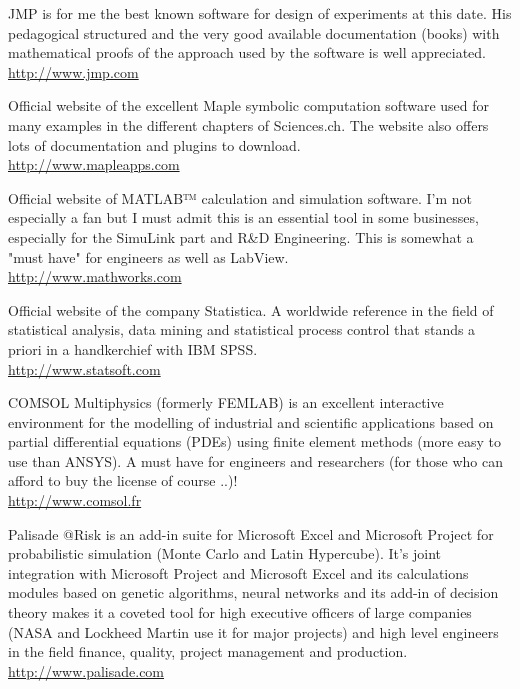 	{\Large {}}{\Large {}}{\Large {}} JMP is for me the best known software for design of experiments at this date. His pedagogical structured and the very good available documentation (books) with mathematical proofs of the approach used by the software is well appreciated.\\
	\href{http://www.jmp.com}{\color{blue}http://www.jmp.com}
	
	{\Large {}}{\Large {}}{\Large {}}{\Large {}} Official website of the excellent Maple symbolic computation software used for many examples in the different chapters of Sciences.ch. The website also offers lots of documentation and plugins to download.\\
	\href{http://www.mapleapps.com}{\color{blue}http://www.mapleapps.com}
	
	{\Large {}}{\Large {}}{\Large {}} Official website of MATLAB™ calculation and simulation software. I'm not especially a fan but I must admit this is an essential tool in some businesses, especially for the SimuLink part and R\&D Engineering. This is somewhat a "must have" for engineers as well as LabView.\\
	\href{http://www.mathworks.com}{\color{blue}http://www.mathworks.com}
	
	{\Large {}}{\Large {}}{\Large {}} Official website of the company Statistica. A worldwide reference in the field of statistical analysis, data mining and statistical process control that stands a priori in a handkerchief with IBM SPSS.\\
	\href{http://www.statsoft.com}{\color{blue}http://www.statsoft.com}
	
	{\Large {}}{\Large {}}{\Large {}}{\Large {}} COMSOL Multiphysics (formerly FEMLAB) is an excellent interactive environment for the modelling of industrial and scientific applications based on partial differential equations (PDEs) using finite element methods (more easy to use than ANSYS). A must have for engineers and researchers (for those who can afford to buy the license of course ..)!\\
	\href{http://www.comsol.fr}{\color{blue}http://www.comsol.fr}
	
	{\Large {}}{\Large {}}{\Large {}}{\Large {}} Palisade @Risk is an add-in suite for Microsoft Excel and Microsoft Project for probabilistic simulation (Monte Carlo and Latin Hypercube). It's joint integration with Microsoft Project and Microsoft Excel and its calculations modules based on genetic algorithms, neural networks and its add-in of decision theory makes it a coveted tool for high executive officers of large companies (NASA and Lockheed Martin use it for major projects) and high level engineers in the field finance, quality, project management and production.\\
	\href{http://www.palisade.com}{\color{blue}http://www.palisade.com}
	

